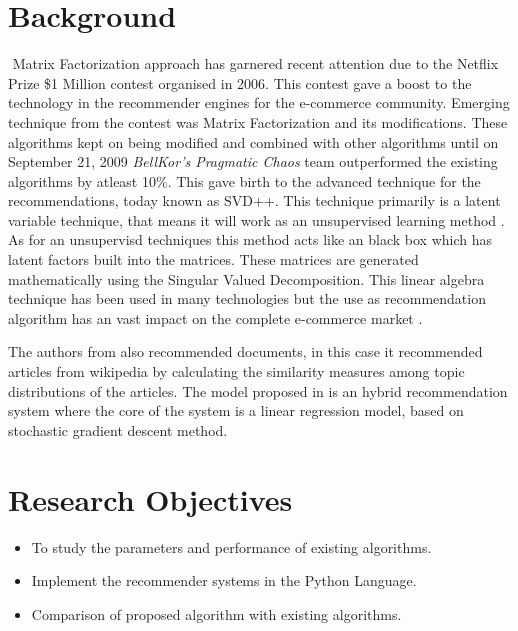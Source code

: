 \section{Background}‌​‌​‌​‌​‌​‌​‌​‌​‌​‌​‌​‌​‌​‌​‌​‌​
Matrix Factorization approach has garnered recent attention due to the Netflix Prize \cite{Bennett2007} \$1 Million contest organised in 2006. This contest gave a boost to the technology in the recommender engines for the e-commerce community. Emerging technique from the contest was Matrix Factorization and its modifications. These algorithms kept on being modified and combined with other algorithms until on September 21, 2009 \textit{BellKor's Pragmatic Chaos} team outperformed the existing algorithms by atleast 10\%. This gave birth to the advanced technique for the recommendations, today known as SVD++. This technique primarily is a latent variable technique, that means it will work as an unsupervised learning method \cite{Aggarwal2013}. As for an unsupervisd techniques this method acts like an black box which has latent factors built into the matrices. These matrices are generated mathematically using the Singular Valued Decomposition. This linear algebra technique has been used in many technologies but the use as recommendation algorithm has an vast impact on the complete e-commerce market \cite{Koren2009}.

The authors from \cite{Wilbur1992} also recommended documents, in this case it recommended articles from wikipedia by calculating the similarity measures among topic distributions of the articles. The model proposed in \cite{Schein2002} is an hybrid recommendation system where the core of the system is a linear regression model, based on stochastic gradient descent method.

\section{Research Objectives}
\begin{itemize}
	\item To study the parameters and performance of existing algorithms.
	\item Implement the recommender systems in the Python Language.
	\item Comparison of proposed algorithm with existing algorithms.
\end{itemize}


